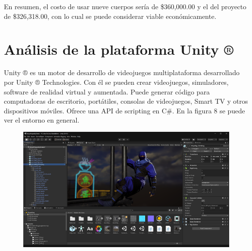 En resumen, el costo de usar nueve cuerpos sería de \$360,000.00 y el del proyecto de \$326,318.00, con lo cual se puede considerar viable económicamente.\\

\section{Análisis de la plataforma Unity ®}
Unity ® es un motor de desarrollo de videojuegos multiplataforma desarrollado por Unity ® Technologies. Con él se pueden crear videojuegos, simuladores, software de realidad virtual y aumentada. Puede generar código para computadoras de escritorio, portátiles, consolas de videojuegos, Smart TV y otros dispositivos móviles. Ofrece una API de scripting en C\#. En la figura 8 se puede ver el entorno en general.\\
\begin{figure}[H]
	\begin{center}
 		\includegraphics[width = .5\textwidth]{source/images/image33.png}
	\end{center} 
\end{figure}

